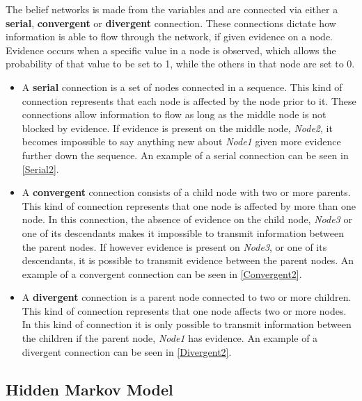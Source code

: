 The belief networks is made from the variables and are connected via either a
\textbf{serial}, \textbf{convergent} or \textbf{divergent} connection. These
connections dictate how information is able to flow through the network, if
given evidence on a node. Evidence occurs when a specific value in a node is observed,
which allows the probability of that value to be set to 1, while the others in
that node are set to 0.
\begin{itemize}
  \item A \textbf{serial} connection is a set of nodes connected in a sequence.
  This kind of connection represents that each node is affected by the node
  prior to it. These connections allow information to flow as long as the middle
  node is not blocked by evidence. If evidence is present on the middle node,
  \textit{Node2}, it becomes impossible to say anything new about
  \textit{Node1} given more evidence further down the sequence. An example of a
  serial connection can be seen in \autoref{Serial2}.
  \item A \textbf{convergent} connection consists of a child node with two or
  more parents. This kind of connection represents that one node is affected by
  more than one node. In this connection, the absence of evidence on the child
  node, \textit{Node3} or one of its descendants makes it impossible to
  transmit information between the parent nodes. If however evidence is present
  on \textit{Node3}, or one of its descendants, it is possible to transmit
  evidence between the parent nodes. An example of a convergent connection can
  be seen in \autoref{Convergent2}.
  \item A \textbf{divergent} connection is a parent node connected to two or
  more children. This kind of connection represents that one node affects two or
  more nodes. In this kind of connection it is only possible to transmit
  information between the children if the parent node, \textit{Node1}
  has evidence. An example of a divergent connection can be seen in
  \autoref{Divergent2}.
\end{itemize}



\subsection{Hidden Markov Model}\label{ModelHMM}

